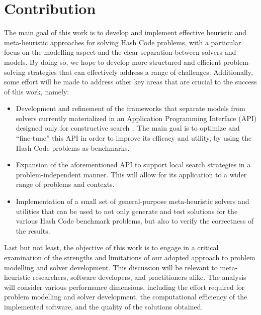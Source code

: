 \section{Contribution}
\label{section:contribution}

The main goal of this work is to develop and implement effective heuristic and
meta-heuristic approaches for solving Hash Code problems, with a particular
focus on the modelling aspect and the clear separation between solvers and
models. By doing so, we hope to develop more structured and efficient
problem-solving strategies that can effectively address a range of challenges.
Additionally, some effort will be made to address other key areas that are
crucial to the success of this work, namely:

\begin{itemize}
  \item Development and refinement of the frameworks that separate models from solvers
        currently materialized in an Application Programming Interface (API)
        designed only for constructive search~\cite{outeiro2021application}.
        The main goal is to optimize and ``fine-tune'' this API in order to improve its
        efficacy and utility, by using the Hash Code problems as benchmarks.

  \item Expansion of the aforementioned API to support local search strategies
        in a problem-independent manner. This will allow for its application to a wider
        range of problems and contexts.

  \item Implementation of a small set of general-purpose meta-heuristic solvers and utilities
        that can be used to not only generate and test solutions for the various
        Hash Code benchmark problems, but also to verify the correctness of the results.
\end{itemize}

Last but not least, the objective of this work is to engage in a critical
examination of the strengths and limitations of our adopted approach to problem
modelling and solver development. This discussion will be relevant to
meta-heuristic researchers, software developers, and practitioners alike. The
analysis will consider various performance dimensions, including the effort
required for problem modelling and solver development, the computational
efficiency of the implemented software, and the quality of the solutions
obtained.